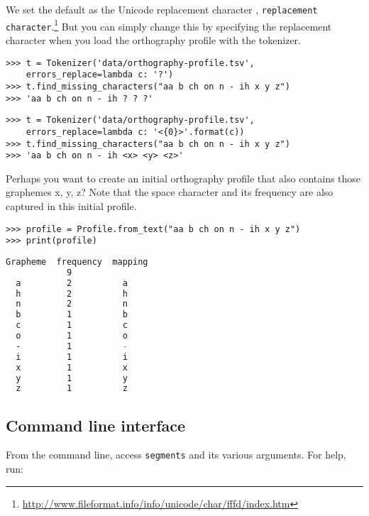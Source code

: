 \documentclass[output=book,nonflat,modfonts,
colorlinks, citecolor=brown,
		]{langsci/langscibook}\usepackage[]{graphicx}\usepackage[]{color}
\begin{document}
\noindent We set the default as the Unicode replacement character , \texttt{replacement character}.\footnote{\url{http://www.fileformat.info/info/unicode/char/fffd/index.htm}} But you can simply change this by specifying the replacement character when you load the orthography profile with the tokenizer.


\begin{lstlisting}
>>> t = Tokenizer('data/orthography-profile.tsv', 
	errors_replace=lambda c: '?')
>>> t.find_missing_characters("aa b ch on n - ih x y z")
>>> 'aa b ch on n - ih ? ? ?'
\end{lstlisting}

\begin{lstlisting}
>>> t = Tokenizer('data/orthography-profile.tsv', 
	errors_replace=lambda c: '<{0}>'.format(c))
>>> t.find_missing_characters("aa b ch on n - ih x y z")
>>> 'aa b ch on n - ih <x> <y> <z>'
\end{lstlisting}

\noindent Perhaps you want to create an initial orthography profile that also contains those graphemes x, y, z? Note that the space character and its frequency are also captured in this initial profile.

\begin{lstlisting}
>>> profile = Profile.from_text("aa b ch on n - ih x y z")
>>> print(profile)
\end{lstlisting}


\begin{lstlisting}[language=bash,texcl=true]
  Grapheme  frequency  mapping
            9
  a         2          a
  h         2          h
  n         2          n
  b         1          b
  c         1          c
  o         1          o
  -         1          -
  i         1          i
  x         1          x
  y         1          y
  z         1          z
\end{lstlisting}


\subsection*{Command line interface}

From the command line, access \texttt{segments} and its 
various arguments. For help, run:
\end{document}
